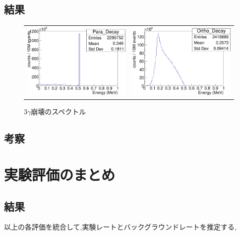 \subsection{結果}

\begin{figure}[htbp]
	\begin{tabular}{cc}

	\centering
		\begin{minipage}{0.5\hsize}
		\includegraphics[width=7cm]{fig/gamma2.pdf}
	\caption{$2\gamma$崩壊のスペクトル}
	\label{gamma2}
		\end{minipage}&

		\begin{minipage}{0.5\hsize}
	\centering
		\includegraphics[width=7cm]{fig/gamma3.pdf}
	\caption{$3\gamma$崩壊のスペクトル}
	\label{gamma3}
		\end{minipage}

		\end{tabular}
\end{figure}

\subsection{考察}


\section{実験評価のまとめ}

\subsection{結果}
以上の各評価を統合して,実験レートとバックグラウンドレートを推定する,

